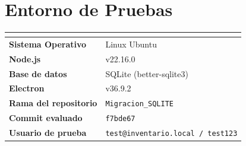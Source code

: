 \section{Entorno de Pruebas}

\renewcommand{\arraystretch}{1.65}
\begin{tabularx}{\linewidth}{|>{\bfseries}l|X|}
\hline
\rowcolor{grisheader} \multicolumn{2}{|c|}{\textbf{Entorno de Ejecución}} \\
\hline
Sistema Operativo   & Linux Ubuntu \\
\hline
Node.js             & v22.16.0 \\
\hline
Base de datos       & SQLite (better-sqlite3) \\
\hline
Electron            & v36.9.2 \\
\hline
Rama del repositorio & \texttt{Migracion\_SQLITE} \\
\hline
Commit evaluado     & \texttt{f7bde67} \\
\hline
Usuario de prueba   & \texttt{test@inventario.local / test123} \\
\hline
\end{tabularx}
